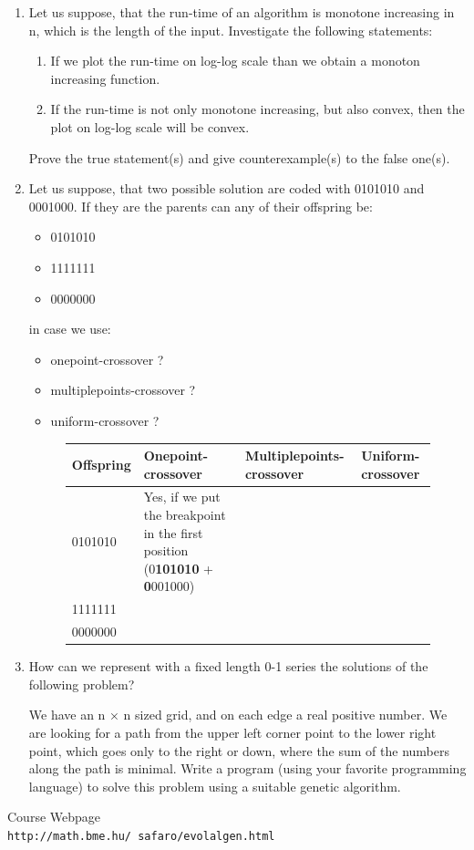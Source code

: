 \documentclass[12pt,english]{article}
\begin{document}
\begin{enumerate}
	\item Let us suppose, that the run-time of an algorithm is monotone increasing in n, which is the length of the input. Investigate the following statements:
	\begin{enumerate}
		\item If we plot the run-time on log-log scale than we obtain a monoton increasing function.
		\item If the run-time is not only monotone increasing, but also convex, then the plot on log-log scale will be convex.
	\end{enumerate}
	Prove the true statement(s) and give counterexample(s) to the false one(s).
	\item Let us suppose, that two possible solution are coded with 0101010 and 0001000. If they are the parents can any of their offspring be:
	\begin{itemize}
		\item 0101010
		\item 1111111
		\item 0000000
	\end{itemize}
in case we use:
\begin{itemize}
	\item onepoint-crossover ?
	\item multiplepoints-crossover ?
	\item uniform-crossover ?
\end{itemize}

\begin{figure}[H]
\centering
	\begin{tabular}{|m{3cm}|m{4cm}|m{4cm}|m{4cm}|}
	\hline
		\textbf{Offspring} & \textbf{Onepoint-crossover} & \textbf{Multiplepoints-crossover} & \textbf{Uniform-crossover}\\
		\hline
		 0101010 & Yes, if we put the breakpoint in the first position (0\textbf{101010} + \textbf{0}001000)& & \\
		 \hline
		 1111111 & & & \\
		 \hline
		 0000000 & & & \\
		 \hline
	\end{tabular}
\end{figure}

\item How can we represent with a fixed length 0-1 series the solutions of the following problem?

We have an n × n sized grid, and on each edge a real positive number.
We are looking for a path from the upper left corner point to the lower
right point, which goes only to the right or down, where the sum of the numbers along the path is minimal. Write a program (using your favorite programming language) to solve this problem using a suitable genetic algorithm.


\end{enumerate}


\begin{thebibliography}{9}

Course Webpage
\\\texttt{http://math.bme.hu/~safaro/evolalgen.html}

\end{thebibliography}
\end{document}
